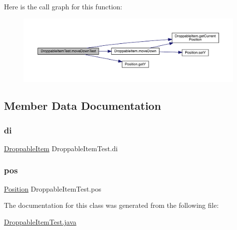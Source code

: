 Here is the call graph for this function\+:
\nopagebreak
\begin{figure}[H]
\begin{center}
\leavevmode
\includegraphics[width=350pt]{class_droppable_item_test_a6cf1fa022a5a09f02c6674dc66db4efb_cgraph}
\end{center}
\end{figure}


\subsection{Member Data Documentation}
\mbox{\label{class_droppable_item_test_a27f44f35ae846f3fec4c0c526d465340}} 
\subsubsection{\texorpdfstring{di}{di}}
{\footnotesize\ttfamily \mbox{\hyperlink{class_droppable_item}{Droppable\+Item}} Droppable\+Item\+Test.\+di}

\mbox{\label{class_droppable_item_test_adad841a7c8ecced949d2b2d925163e5a}} 
\subsubsection{\texorpdfstring{pos}{pos}}
{\footnotesize\ttfamily \mbox{\hyperlink{class_position}{Position}} Droppable\+Item\+Test.\+pos}



The documentation for this class was generated from the following file\+:\begin{DoxyCompactItemize}
\item 
\mbox{\hyperlink{_droppable_item_test_8java}{Droppable\+Item\+Test.\+java}}\end{DoxyCompactItemize}
